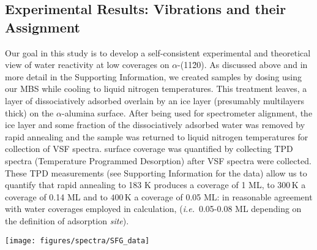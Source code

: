\documentclass[twoside,twocolumn,9pt]{article}
\begin{document}
\subsection{Experimental Results: Vibrations and their Assignment\label{res_exp}}
%
Our goal in this study is to develop a self-consistent experimental and theoretical view of water reactivity at low coverages on $\alpha$-(11\=20). As discussed above and in more detail in the Supporting Information, we created samples by dosing  using our MBS while cooling to liquid nitrogen temperatures. This treatment leaves, a layer of dissociatively adsorbed  overlain by an ice layer (presumably multilayers thick) on the $\alpha$-alumina surface. After being used for spectrometer alignment, the ice layer and some fraction of the dissociatively adsorbed water was removed by rapid annealing and the sample was returned to liquid nitrogen temperatures for collection of VSF spectra.  surface coverage was quantified by collecting TPD spectra (Temperature Programmed Desorption) after VSF spectra were collected. These TPD measurements (see Supporting Information for the data) allow us to quantify that rapid annealing to 183 K produces a  coverage of 1 ML, to $300\,$K a coverage of 0.14 ML and to $400\,$K a coverage of 0.05 ML:  in reasonable agreement with water coverages employed in calculation, (\textit{i.e.}\ 0.05-0.08 ML depending on the definition of adsorption {\it site}).
%
\begin{figure*}
\begin{center} 
\texttt{[image: figures/spectra/SFG\_data]}
\end{center} 
\caption{VSF spectra of  adsorbed on $\alpha$-(11\=20) at 0.14 ML surface coverage (left panel), after annealing to 300 K, and at 0.05 ML surface coverage (right panel), after annealing to 400 K.  The squared modulus of resonances resulting from the fit are plotted below each data set. Note that all VSF measurements are carried out when the sample is cooled to $130\,$ K after the indicated heating step.}
\label{G-SFG1}
\end{figure*}
\end{document}
